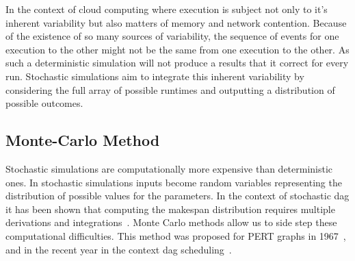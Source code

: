 \documentclass[10pt,conference,compsocconf]{IEEEtran}
\begin{document}

In the context of cloud computing where execution is subject not only to it's
inherent variability but also matters of memory and network contention. Because
of the existence of so many sources of variability, the sequence of events for
one execution to the other might not be the same from one execution to the
other. As such a deterministic simulation will not produce a results that it
correct for every run. Stochastic simulations aim to integrate this inherent
variability by considering the full array of possible runtimes and outputting a
distribution of possible outcomes.

\subsection{Monte-Carlo Method}\label{sec:MCS}

Stochastic  simulations are  computationally more  expensive than  deterministic
ones. In stochastic simulations inputs  become random variables representing the
distribution of possible values for the parameters. In the context of stochastic
\ac{dag} it has  been shown that computing the  makespan distribution requires
multiple derivations and  integrations~\cite{Ludwig01,Li97}. Monte Carlo methods
allow us to side step these computational difficulties. This method was proposed
for PERT  graphs in 1967~\cite{Slyke63}, and  in the recent year  in the context
\ac{dag} scheduling~\cite{Canon10,Zheng13}.
\end{document}
